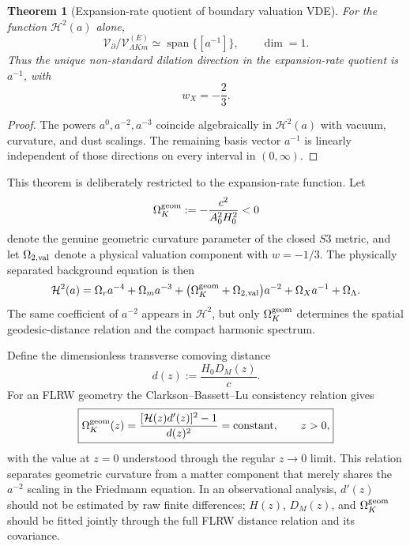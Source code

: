 \documentclass[11pt,a4paper]{article}
\def\Sthree{S3}%
\numberwithin{equation}{section}
\theoremstyle{definition}
\theoremstyle{plain}
\newtheorem{theorem}[criterion]{Theorem}
\theoremstyle{remark}
\newcommand{\Sthree}{S^3}
\begin{document}
\begin{theorem}[Expansion-rate quotient of boundary valuation VDE]
For the function \(\mathcal H^2(a)\) alone,
\begin{equation}
\boxed{
\mathcal V_{\partial}/\mathcal V_{\Lambda Km}^{(E)}
\simeq\operatorname{span}\{[a^{-1}]\},
\qquad
\dim=1.
}
\end{equation}
Thus the unique non-standard dilation direction in the expansion-rate quotient is \(a^{-1}\), with
\begin{equation}
w_X=-\frac23.
\end{equation}
\end{theorem}
\begin{proof}
The powers \(a^0,a^{-2},a^{-3}\) coincide algebraically in \(\mathcal H^2(a)\) with vacuum, curvature, and dust scalings. The remaining basis vector \(a^{-1}\) is linearly independent of those directions on every interval in \((0,\infty)\).
\end{proof}

This theorem is deliberately restricted to the expansion-rate function. Let
\begin{equation}
\Omega_K^{\rm geom}
:=-\frac{c^2}{A_0^2H_0^2}<0
\end{equation}
denote the genuine geometric curvature parameter of the closed \(\Sthree\) metric, and let \(\Omega_{2,\rm val}\) denote a physical valuation component with \(w=-1/3\). The physically separated background equation is then
\begin{equation}
\mathcal H^2(a)=
\Omega_ra^{-4}
+\Omega_ma^{-3}
+\bigl(\Omega_K^{\rm geom}+\Omega_{2,\rm val}\bigr)a^{-2}
+\Omega_Xa^{-1}
+\Omega_\Lambda.
\end{equation}
The same coefficient of \(a^{-2}\) appears in \(\mathcal H^2\), but only \(\Omega_K^{\rm geom}\) determines the spatial geodesic-distance relation and the compact harmonic spectrum.

Define the dimensionless transverse comoving distance
\begin{equation}
d(z):=\frac{H_0D_M(z)}{c}.
\end{equation}
For an FLRW geometry the Clarkson--Bassett--Lu consistency relation gives \cite{ClarksonBassettLu2008}
\begin{equation}
\boxed{
\Omega_K^{\rm geom}(z)
=\frac{[\mathcal H(z)d'(z)]^2-1}{d(z)^2}
=\text{constant},
\qquad z>0,
}
\end{equation}
with the value at \(z=0\) understood through the regular \(z\to0\) limit. This relation separates geometric curvature from a matter component that merely shares the \(a^{-2}\) scaling in the Friedmann equation. In an observational analysis, \(d'(z)\) should not be estimated by raw finite differences; \(H(z)\), \(D_M(z)\), and \(\Omega_K^{\rm geom}\) should be fitted jointly through the full FLRW distance relation and its covariance.
\end{document}
